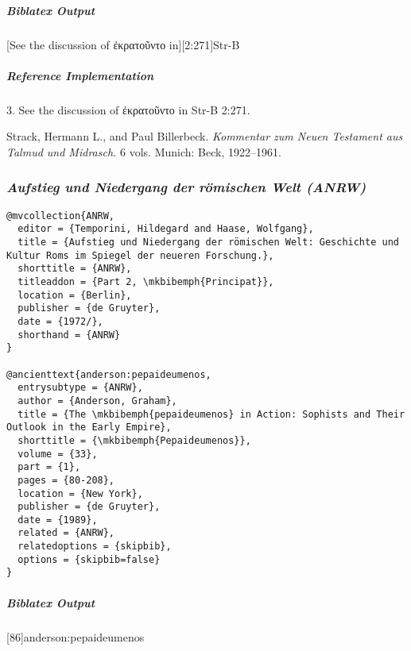 \documentclass[a4paper]{article}
\newcommand{\textgreek}[1]{{\greekfont #1}}
\newenvironment{biboutput}{%
  \subparagraph{Biblatex Output}
}{\color{black}}
\newenvironment{refimp}{%
  \subparagraph{Reference Implementation}
  \color{reference-colour}
  \rm
}{\par\color{black}}
\begin{document}
\begin{biboutput}
  [See the discussion of \textgreek{ἐκρατοῦντο} in][2:271]{Str-B}
\end{biboutput}

\begin{refimp}
  \hspace*{\bibindent}3. See the discussion of \textgreek{ἐκρατοῦντο} in Str-B
  2:271.

  \hangindent\bibindent Strack, Hermann L., and Paul Billerbeck.
  \emph{Kommentar zum Neuen Testament aus Talmud und Midrasch.} 6 vols.
  Munich: Beck, 1922–1961.

  \sloppy{}
\end{refimp}

\subsubsection{\emph{Aufstieg und Niedergang der römischen Welt (ANRW)}}

\begin{lstlisting}
@mvcollection{ANRW,
  editor = {Temporini, Hildegard and Haase, Wolfgang},
  title = {Aufstieg und Niedergang der römischen Welt: Geschichte und Kultur Roms im Spiegel der neueren Forschung.},
  shorttitle = {ANRW},
  titleaddon = {Part 2, \mkbibemph{Principat}},
  location = {Berlin},
  publisher = {de Gruyter},
  date = {1972/},
  shorthand = {ANRW}
}

@ancienttext{anderson:pepaideumenos,
  entrysubtype = {ANRW},
  author = {Anderson, Graham},
  title = {The \mkbibemph{pepaideumenos} in Action: Sophists and Their Outlook in the Early Empire},
  shorttitle = {\mkbibemph{Pepaideumenos}},
  volume = {33},
  part = {1},
  pages = {80-208},
  location = {New York},
  publisher = {de Gruyter},
  date = {1989},
  related = {ANRW},
  relatedoptions = {skipbib},
  options = {skipbib=false}
}
\end{lstlisting}

\begin{biboutput}
  [86]{anderson:pepaideumenos}
\end{biboutput}
\end{document}

